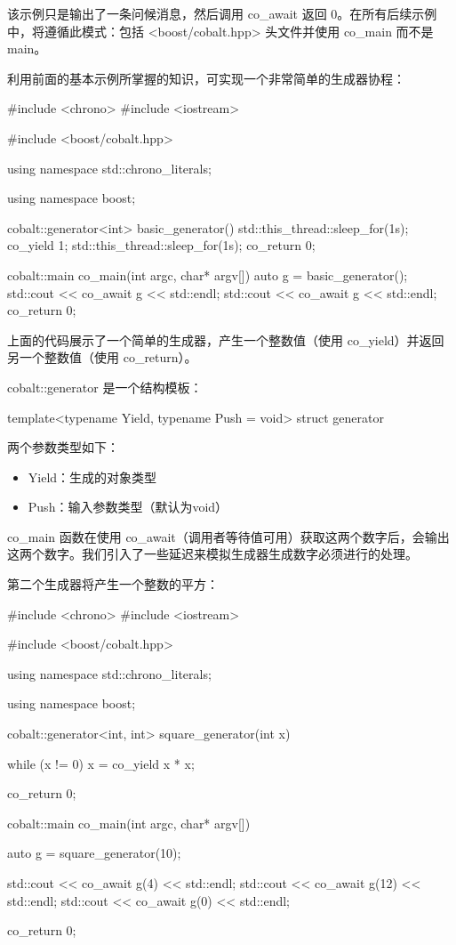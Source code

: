 该示例只是输出了一条问候消息，然后调用 co\_await 返回 0。在所有后续示例中，将遵循此模式：包括 <boost/cobalt.hpp> 头文件并使用 co\_main 而不是 main。


利用前面的基本示例所掌握的知识，可实现一个非常简单的生成器协程：

\begin{cpp}
#include <chrono>
#include <iostream>

#include <boost/cobalt.hpp>

using namespace std::chrono_literals;

using namespace boost;

cobalt::generator<int> basic_generator()
{
    std::this_thread::sleep_for(1s);
    co_yield 1;
    std::this_thread::sleep_for(1s);
    co_return 0;
}

cobalt::main co_main(int argc, char* argv[]) {
    auto g = basic_generator();
    std::cout << co_await g << std::endl;
    std::cout << co_await g << std::endl;
    co_return 0;
}
\end{cpp}

上面的代码展示了一个简单的生成器，产生一个整数值（使用 co\_yield）并返回另一个整数值（使用 co\_return）。

cobalt::generator 是一个结构模板：

\begin{cpp}
template<typename Yield, typename Push = void>
struct generator
\end{cpp}

两个参数类型如下：

\begin{itemize}
\item
Yield：生成的对象类型

\item
Push：输入参数类型（默认为void）
\end{itemize}

co\_main 函数在使用 co\_await（调用者等待值可用）获取这两个数字后，会输出这两个数字。我们引入了一些延迟来模拟生成器生成数字必须进行的处理。

第二个生成器将产生一个整数的平方：

\begin{cpp}
#include <chrono>
#include <iostream>

#include <boost/cobalt.hpp>

using namespace std::chrono_literals;

using namespace boost;

cobalt::generator<int, int> square_generator(int x){
    while (x != 0) {
        x = co_yield x * x;
    }

    co_return 0;
}

cobalt::main co_main(int argc, char* argv[]){
    auto g = square_generator(10);

    std::cout << co_await g(4) << std::endl;
    std::cout << co_await g(12) << std::endl;
    std::cout << co_await g(0) << std::endl;

    co_return 0;
}
\end{cpp}

